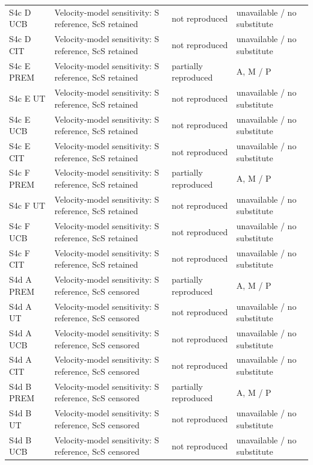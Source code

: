 \documentclass[10pt]{article}
\begin{document}
\begin{longtable}{p{.23\linewidth}p{.25\linewidth}p{.19\linewidth}p{.22\linewidth}}
S4c D UCB & Velocity-model sensitivity: S reference, ScS retained & not reproduced & unavailable / no substitute \\
S4c D CIT & Velocity-model sensitivity: S reference, ScS retained & not reproduced & unavailable / no substitute \\
S4c E PREM & Velocity-model sensitivity: S reference, ScS retained & partially reproduced & A, M / P \\
S4c E UT & Velocity-model sensitivity: S reference, ScS retained & not reproduced & unavailable / no substitute \\
S4c E UCB & Velocity-model sensitivity: S reference, ScS retained & not reproduced & unavailable / no substitute \\
S4c E CIT & Velocity-model sensitivity: S reference, ScS retained & not reproduced & unavailable / no substitute \\
S4c F PREM & Velocity-model sensitivity: S reference, ScS retained & partially reproduced & A, M / P \\
S4c F UT & Velocity-model sensitivity: S reference, ScS retained & not reproduced & unavailable / no substitute \\
S4c F UCB & Velocity-model sensitivity: S reference, ScS retained & not reproduced & unavailable / no substitute \\
S4c F CIT & Velocity-model sensitivity: S reference, ScS retained & not reproduced & unavailable / no substitute \\
S4d A PREM & Velocity-model sensitivity: S reference, ScS censored & partially reproduced & A, M / P \\
S4d A UT & Velocity-model sensitivity: S reference, ScS censored & not reproduced & unavailable / no substitute \\
S4d A UCB & Velocity-model sensitivity: S reference, ScS censored & not reproduced & unavailable / no substitute \\
S4d A CIT & Velocity-model sensitivity: S reference, ScS censored & not reproduced & unavailable / no substitute \\
S4d B PREM & Velocity-model sensitivity: S reference, ScS censored & partially reproduced & A, M / P \\
S4d B UT & Velocity-model sensitivity: S reference, ScS censored & not reproduced & unavailable / no substitute \\
S4d B UCB & Velocity-model sensitivity: S reference, ScS censored & not reproduced & unavailable / no substitute \\

\end{longtable}
\end{document}
